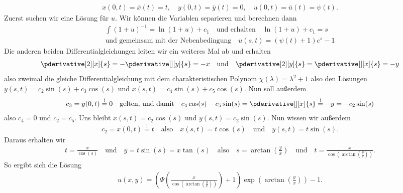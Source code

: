 \begin{solution}
	\begin{align*}
	x(0, t) = \overline{x}(t) = t, \quad
	y(0, t) = \overline{y}(t) = 0, \quad
	u(0, t) = \overline{u}(t) = \psi(t).
	\end{align*}
	Zuerst suchen wir eine Lösung für $u$. Wir können die Variablen separieren und berechnen dann 
	\begin{align*}
	\int (1 + u)^{-1} = \ln(1 + u) + c_1 \quad \text{und erhalten} \quad \ln(1 + u) + c_1 = s \\ \text{und gemeinsam mit der Nebenbedingung} \quad u(s,t) = (\psi(t) + 1) e^s - 1
	\end{align*}
	Die anderen beiden Differentialgleichungen leiten wir ein weiteres Mal ab und erhalten 
	\begin{align*}
	\pderivative[2][x]{s} = - \pderivative[][y]{s} = -x \quad \text{und} \quad \pderivative[2][y]{s} = \pderivative[][x]{s} = -y
	\end{align*}
	also zweimal die gleiche Differentialgleichung mit dem charakteristischen Polynom $\chi(\lambda) = \lambda^2 + 1$ also den Lösungen $y(s,t) = c_2 \sin(s) + c_3 \cos(s)$ und $x(s,t) = c_4 \sin(s) + c_5 \cos(s)$.
	Nun soll außerdem 
	\begin{align*}
	c_3 = y(0,t) \stackrel{!}{=} 0 \quad \text{gelten, und damit} \quad c_4 \cos(s) - c_5 \sin(s) = \pderivative[][x]{s} \stackrel{!}{=} -y = -c_2 \sin(s) 
	\end{align*}
	also $c_4 = 0$ und $c_2 = c_5$. Uns bleibt $x(s,t) = c_2 \cos(s)$ und $y(s,t) = c_2 \sin(s)$. Nun wissen wir außerdem 
	\begin{align*}
	c_2 = x(0,t) \stackrel{!}{=} t \quad \text{also} \quad x(s,t) = t \cos(s) \quad \text{und} \quad y(s,t) = t \sin(s).
	\end{align*}
	Daraus erhalten wir
	\begin{align*}
	t = \frac{x}{\cos(s)} \quad \text{und} \quad y = t \sin(s) = x \tan(s) \quad \text{also} \quad s = \arctan\left(\frac{y}{x}\right) \quad \text{und} \quad t = \frac{x}{\cos\left(\arctan\left(\frac{y}{x}\right)\right)}.
	\end{align*}
	So ergibt sich die Lösung
	\begin{align*}
	u(x,y) = \left(\Psi\left(\frac{x}{\cos\left(\arctan\left(\frac{y}{x}\right)\right)}\right) + 1\right) \exp\left(\arctan\left(\frac{y}{x}\right)\right) - 1.
	\end{align*}
\end{solution}